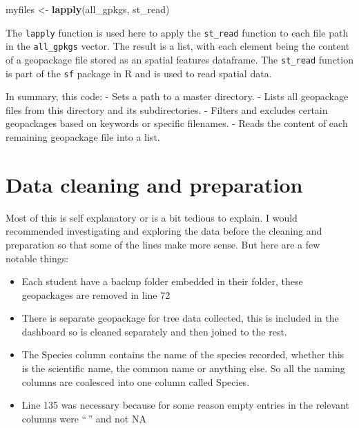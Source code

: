 \documentclass[
]{book}
\newenvironment{Shaded}{\begin{snugshade}}{\end{snugshade}}
\newcommand{\FunctionTok}[1]{\textcolor[rgb]{0.13,0.29,0.53}{\textbf{#1}}}
\newcommand{\NormalTok}[1]{#1}
\newcommand{\OtherTok}[1]{\textcolor[rgb]{0.56,0.35,0.01}{#1}}
\providecommand{\tightlist}{%
  \setlength{\itemsep}{0pt}\setlength{\parskip}{0pt}}
\theoremstyle{definition}
\theoremstyle{definition}
\theoremstyle{definition}
\theoremstyle{definition}
\theoremstyle{remark}
\begin{document}
\begin{Shaded}
\begin{Highlighting}[]
\NormalTok{myfiles }\OtherTok{\textless{}{-}} \FunctionTok{lapply}\NormalTok{(all\_gpkgs, st\_read)}
\end{Highlighting}
\end{Shaded}

The \texttt{lapply} function is used here to apply the \texttt{st\_read} function to each file path in the \texttt{all\_gpkgs} vector. The result is a list, with each element being the content of a geopackage file stored as an spatial features dataframe. The \texttt{st\_read} function is part of the \texttt{sf} package in R and is used to read spatial data.

In summary, this code:
- Sets a path to a master directory.
- Lists all geopackage files from this directory and its subdirectories.
- Filters and excludes certain geopackages based on keywords or specific filenames.
- Reads the content of each remaining geopackage file into a list.

\hypertarget{data-cleaning-and-preparation}{%
\section{Data cleaning and preparation}\label{data-cleaning-and-preparation}}

Most of this is self explanatory or is a bit tedious to explain. I would recommended investigating and exploring the data before the cleaning and preparation so that some of the lines make more sense. But here are a few notable things:

\begin{itemize}
\tightlist
\item
  Each student have a backup folder embedded in their folder, these geopackages are removed in line 72
\item
  There is separate geopackage for tree data collected, this is included in the dashboard so is cleaned separately and then joined to the rest.
\item
  The Species column contains the name of the species recorded, whether this is the scientific name, the common name or anything else. So all the naming columns are coalesced into one column called Species.
\item
  Line 135 was necessary because for some reason empty entries in the relevant columns were ``\,'' and not NA
\end{itemize}
\end{document}
